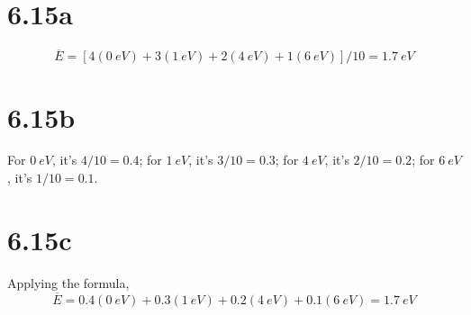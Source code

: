 \documentclass{article}
\begin{document}
\section*{6.15a}
\[\overline{E}=[4(\SI{0}{eV})+3(\SI{1}{eV})+2(\SI{4}{eV})+1(\SI{6}{eV})]/10=\SI{1.7}{eV}\]

\section*{6.15b}
For $\SI{0}{eV}$, it's $4/10=0.4$; for $\SI{1}{eV}$, it's $3/10=0.3$; for $\SI{4}{eV}$, it's $2/10=0.2$; for $\SI{6}{eV}$, it's $1/10=0.1$.

\section*{6.15c}
Applying the formula,
\[\overline{E}=0.4(\SI{0}{eV})+0.3(\SI{1}{eV})+0.2(\SI{4}{eV})+0.1(\SI{6}{eV})=\SI{1.7}{eV}\]
\end{document}
